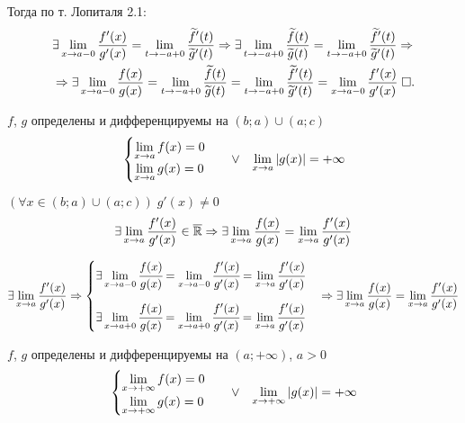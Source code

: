 \documentclass{article}
\begin{document}
Тогда по т. Лопиталя 2.1:
\begin{align*}
	 & \exists\lim\limits_{x\to a-0}\frac{f'(x)}{g'(x)}=\lim\limits_{t\to -a+0}\frac{\widetilde{f}'(t)}{\widetilde{g}'(t)}\Rightarrow
	\exists\lim\limits_{t\to -a+0}\frac{\widetilde{f}(t)}{\widetilde{g}(t)}=\lim\limits_{t\to -a+0}\frac{\widetilde{f}'(t)}{\widetilde{g}'(t)}\Rightarrow                                                                            \\
	 & \Rightarrow\exists\lim\limits_{x\to a-0}\frac{f(x)}{g(x)}=\lim\limits_{t\to -a+0}\frac{\widetilde{f}(t)}{\widetilde{g}(t)}=\lim\limits_{t\to -a+0}\frac{\widetilde{f}'(t)}{\widetilde{g}'(t)}=\lim\limits_{x\to a-0}\frac{f'(x)}{g'(x)}\;\square.
\end{align*}

\theorem[Лопиталя 2.3]

$f$, $g$ определены и дифференцируемы на $(b;a)\cup(a;c)$
\begin{align*}
	\begin{cases}
		\lim\limits_{x\to a}f(x)=0 \\
		\lim\limits_{x\to a}g(x)=0
	\end{cases} &  & \lor &  & \lim\limits_{x\to a}|g(x)|=+\infty
\end{align*}

$(\forall x\in(b;a)\cup(a;c))\;g'(x)\neq 0$
\begin{align*}
	\exists \lim\limits_{x\to a}\frac{f'(x)}{g'(x)}\in\overline{\mathbb{R}}\Rightarrow\exists\lim\limits_{x\to a}\frac{f(x)}{g(x)}=\lim\limits_{x\to a}\frac{f'(x)}{g'(x)}
\end{align*}

\proof
\begin{align*}
	\exists\lim\limits_{x\to a}\frac{f'(x)}{g'(x)}\Rightarrow
	\begin{cases}
		\exists\lim\limits_{x\to a-0}\cfrac{f(x)}{g(x)}=\lim\limits_{x\to a-0}\cfrac{f'(x)}{g'(x)}=\lim\limits_{x\to a}\cfrac{f'(x)}{g'(x)} \\[1.5em]
		\exists\lim\limits_{x\to a+0}\cfrac{f(x)}{g(x)}=\lim\limits_{x\to a+0}\cfrac{f'(x)}{g'(x)}=\lim\limits_{x\to a}\cfrac{f'(x)}{g'(x)}
	\end{cases}\Rightarrow\exists\lim\limits_{x\to a}\frac{f(x)}{g(x)}=\lim\limits_{x\to a}\frac{f'(x)}{g'(x)}
\end{align*}

\pagebreak

\theorem[Лопиталя 3.1]

$f$, $g$ определены и дифференцируемы на $(a;+\infty)$, $a>0$
\begin{align*}
	\begin{cases}
		\lim\limits_{x\to +\infty}f(x)=0 \\
		\lim\limits_{x\to +\infty}g(x)=0
	\end{cases} &  & \lor &  & \lim\limits_{x\to +\infty}|g(x)|=+\infty
\end{align*}
\end{document}
